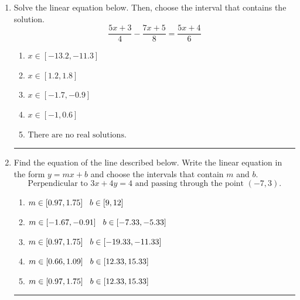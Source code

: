 \documentclass[14pt]{extbook}
\newcommand{\litem}[1]{\item#1\hspace*{-1cm}\rule{\textwidth}{0.4pt}}
\begin{document}
\begin{enumerate}
\litem{
Solve the linear equation below. Then, choose the interval that contains the solution.\[ \frac{5x + 3}{4} - \frac{7x + 5}{8} = \frac{5x + 4}{6} \]\begin{enumerate}[label=\Alph*.]
\item \( x \in [-13.2, -11.3] \)
\item \( x \in [1.2, 1.8] \)
\item \( x \in [-1.7, -0.9] \)
\item \( x \in [-1, 0.6] \)
\item \( \text{There are no real solutions.} \)

\end{enumerate} }
\litem{
Find the equation of the line described below. Write the linear equation in the form $ y=mx+b $ and choose the intervals that contain $m$ and $b$.\[ \text{Perpendicular to } 3 x + 4 y = 4 \text{ and passing through the point } (-7, 3). \]\begin{enumerate}[label=\Alph*.]
\item \( m \in [0.97, 1.75] \hspace*{3mm} b \in [9, 12] \)
\item \( m \in [-1.67, -0.91] \hspace*{3mm} b \in [-7.33, -5.33] \)
\item \( m \in [0.97, 1.75] \hspace*{3mm} b \in [-19.33, -11.33] \)
\item \( m \in [0.66, 1.09] \hspace*{3mm} b \in [12.33, 15.33] \)
\item \( m \in [0.97, 1.75] \hspace*{3mm} b \in [12.33, 15.33] \)


\end{enumerate}}
\end{enumerate}
\end{document}
